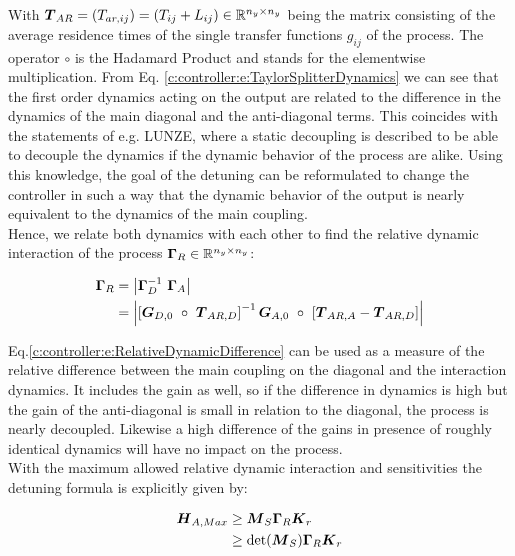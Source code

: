 With $\mbox{\boldmath$T$}_{AR} = (T_{ar,ij}) = (T_{ij} + L_{ij})\in \mathbb{R}^{n_y \times n_y}$ being the matrix consisting of the average residence times of the single transfer functions $g_{ij}$ of the process. The operator $\circ$ is the Hadamard Product and stands for the elementwise multiplication. From Eq. \ref{c:controller:e:TaylorSplitterDynamics} we can see that the first order dynamics acting on the output are related to the difference in the dynamics of the main diagonal and the anti-diagonal terms. This coincides with the statements of e.g. LUNZE, where a static decoupling is described to be able to decouple the dynamics if the dynamic behavior of the process are alike. Using this knowledge, the goal of the detuning can be reformulated to change the controller in such a way that the dynamic behavior of the output is nearly equivalent to the dynamics of the main coupling. \\

Hence, we relate both dynamics with each other to find the relative dynamic interaction of the process $\mbox{\boldmath$\Gamma$}_R \in \mathbb{R}^{n_y \times n_y}$:

\begin{align}
\begin{split}
\mbox{\boldmath$\Gamma$}_R &= \left| \mbox{\boldmath$\Gamma$}_D^{-1}~\mbox{\boldmath$\Gamma$}_A  \right|\\
&= \left| \left[\mbox{\boldmath$G$}_{D,0}~\circ~\mbox{\boldmath$T$}_{AR,D}\right]^{-1} \mbox{\boldmath$G$}_{A,0}~\circ~\left[ \mbox{\boldmath$T$}_{AR,A} - \mbox{\boldmath$T$}_{AR,D}\right] \right|
\end{split}
\label{c:controller:e:RelativeDynamicDifference}
\end{align}

Eq.\ref{c:controller:e:RelativeDynamicDifference} can be used as a measure of the relative difference between the main coupling on the diagonal and the interaction dynamics. It includes the gain as well, so if the difference in dynamics is high but the gain of the anti-diagonal is small in relation to the diagonal, the process is nearly decoupled. Likewise a high difference of the gains in presence of roughly identical dynamics will have no impact on the process.\\

With the maximum allowed relative dynamic interaction and sensitivities the detuning formula is explicitly given by:

\begin{align}
\begin{split}
\mbox{\boldmath$H$}_{A,Max} &\geq \mbox{\boldmath$M$}_S \mbox{\boldmath$\Gamma$}_R \mbox{\boldmath$K$}_r \\ 
&\geq \det(\mbox{\boldmath$M$}_S) \mbox{\boldmath$\Gamma$}_R \mbox{\boldmath$K$}_r 
\end{split}
\end{align}

